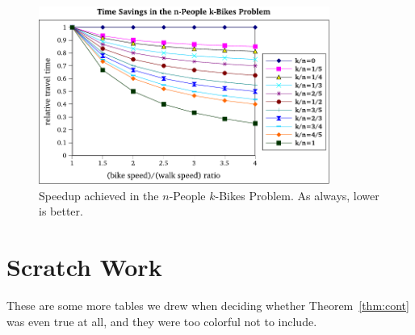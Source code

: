 \documentclass[DIV=calc, paper=a4, fontsize=11pt, twocolumn]{scrartcl}	 %
\newcommand\prob{$n$-People $k$-Bikes Problem}
\begin{document}
\begin{figure}[t]
	\centering
	\includegraphics[width=0.85\textwidth]{graph.pdf}
	\caption{Speedup achieved in the \prob. As always, lower is better.}
	\label{fig:graph}
\end{figure}





\newpage
\appendix
\section{Scratch Work}

These are some more tables we drew when deciding whether Theorem~\ref{thm:cont} was even true at all, and they were too colorful not to include.
\end{document}
